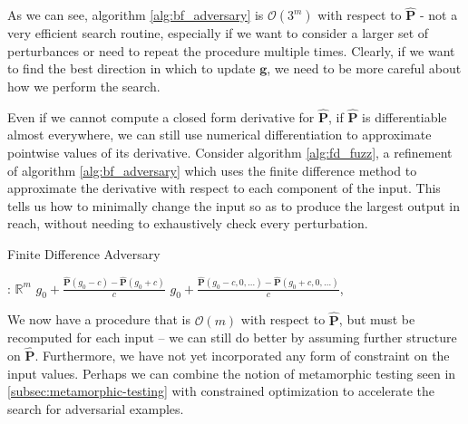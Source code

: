 \documentclass[12pt,initial,twoside,maitrise]{dms}
\numberwithin{equation}{section}
\numberwithin{table}{chapter}
\numberwithin{figure}{chapter}
\begin{document}
As we can see, algorithm \autoref{alg:bf_adversary} is $\mathcal{O}(3^m)$ with respect to $\mathbf{\hat P}$ - not a very efficient search routine, especially if we want to consider a larger set of perturbances or need to repeat the procedure multiple times. Clearly, if we want to find the best direction in which to update $\mathbf g$, we need to be more careful about how we perform the search.

Even if we cannot compute a closed form derivative for $\mathbf{\hat P}$, if $\mathbf{\hat P}$ is differentiable almost everywhere, we can still use numerical differentiation to approximate pointwise values of its derivative. Consider algorithm \autoref{alg:fd_fuzz}, a refinement of algorithm \autoref{alg:bf_adversary} which uses the finite difference method to approximate the derivative with respect to each component of the input. This tells us how to minimally change the input so as to produce the largest output in reach, without needing to exhaustively check every perturbation.

\begin{algorithm}[H]
\caption{Finite Difference Adversary}
\label{alg:fd_fuzz}
\begin{algorithmic}[1]
: $\mathbb{R}^m$
 
\State \Return $g_0 + \frac{\mathbf{\hat P}(g_0 - c) - \mathbf{\hat P}(g_0 + c)}{c}$
\Else {}
\State \Return $g_0 + \frac{\mathbf{\hat P}(g_0 - c, 0, \ldots) - \mathbf{\hat P}(g_0 + c, 0, \ldots)}{c}$, 
\EndIf
\EndProcedure
\end{algorithmic}
\end{algorithm}

We now have a procedure that is $\mathcal{O}(m)$ with respect to $\mathbf{\hat P}$, but must be recomputed for each input -- we can still do better by assuming further structure on $\mathbf{\hat P}$. Furthermore, we have not yet incorporated any form of constraint on the input values. Perhaps we can combine the notion of metamorphic testing seen in \autoref{subsec:metamorphic-testing} with constrained optimization to accelerate the search for adversarial examples.
\end{document}
